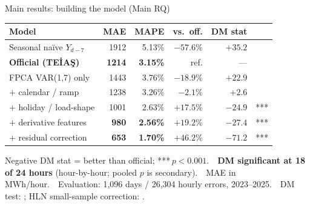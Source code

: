 \documentclass[10pt,aspectratio=169]{beamer}
\begin{document}
\begin{frame}{Main results: building the model (Main RQ)}
  \begin{center}
  \small
  \begin{tabular}{p{}rrrrc}
    \toprule
    Model & MAE & MAPE & vs.\ off. & DM stat & \\
    \midrule
    Seasonal na\"{i}ve $Y_{d-7}$ & 1912 & 5.13\% & $-57.6\%$ & $+35.2$ & \\
    \textbf{Official (TEİAŞ)}    & \textbf{1214} & \textbf{3.15\%}
                                  & ref. & --- & \\
    \midrule
    FPCA VAR(1,7) only           & 1443 & 3.76\% & $-18.9\%$ & $+22.9$ & \\
    $+$ calendar / ramp          & 1238 & 3.26\% & $-2.1\%$  & $+2.6$  & \\
    \rowcolor{wingreen}
    $+$ holiday / load-shape     & 1001 & 2.63\% & $+17.5\%$ & $-24.9$ & *** \\
    \rowcolor{wingreen}
    $+$ derivative features      & \textbf{980} & \textbf{2.56\%}
                                  & $+19.2\%$ & $-27.4$ & *** \\
    \midrule
    \rowcolor{wingreen}
    $+$ residual correction      & \textbf{653} & \textbf{1.70\%}
                                  & $+46.2\%$ & $-71.2$ & *** \\
    \bottomrule
  \end{tabular}
  \end{center}
  \vspace{0.1em}
  \footnotesize
  Negative DM stat = better than official; ***$\,p<0.001$.\ \
  \textbf{DM significant at 18 of 24 hours} (hour-by-hour; pooled $p$ is secondary).\ \
  MAE in MWh/hour.\ \ Evaluation: 1,096 days / 26,304 hourly errors, 2023--2025.\ \
  DM test: \citet{dm_1995}; HLN small-sample correction: \citet{hln_1997}.
\end{frame}
\end{document}
